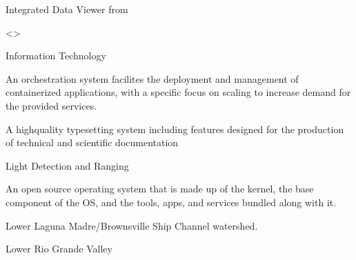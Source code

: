 \documentclass[letterpaper,12pt,english,openany,oneside]{sphinxmanual}
\begin{document}
\begin{description}
\sphinxAtStartPar
Integrated Data Viewer from {\hyperref[\detokenize{glossary:term-UniData}]{}}

\sphinxAtStartPar
\textless{}\textgreater{}

\sphinxAtStartPar
Information Technology

\sphinxAtStartPar
{\hyperref[\detokenize{glossary:term-Kubernetes}]{}}

\sphinxAtStartPar
An orchestration system facilites the deployment and management of containerized applications, with a specific focus on scaling to increase demand for the provided services.

\sphinxAtStartPar
A high\sphinxhyphen{}quality typesetting system including features designed for the production of technical and scientific documentation

\sphinxAtStartPar
Light Detection and Ranging

\sphinxAtStartPar
An open source operating system that is made up of the kernel, the base component of the OS, and the tools, apps, and services bundled along with it.

\sphinxAtStartPar
Lower Laguna Madre/Brownsville Ship Channel watershed.

\sphinxAtStartPar
Lower Rio Grande Valley


\end{description}
\end{document}
